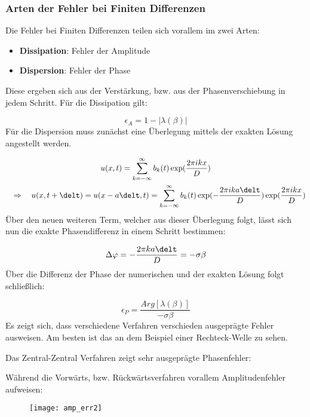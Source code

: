\subsubsection{Arten der Fehler bei Finiten Differenzen}
Die Fehler bei Finiten Differenzen teilen sich vorallem im zwei Arten:
\par
\begin{itemize}
	\item \textbf{Dissipation}: Fehler der Amplitude
	\item \textbf{Dispersion}: Fehler der Phase
\end{itemize}
Diese ergeben sich aus der Verst\"arkung, bzw. aus der Phasenverschiebung in jedem Schritt. F\"ur die Dissipation gilt:
\par
\begin{equation*}
	\epsilon_A = 1 - |\lambda(\beta)|
\end{equation*}
F\"ur die Dispersion muss zun\"achst eine \"Uberlegung mittels der exakten L\"osung angestellt werden.
\par
\begin{multline*}
	u(x,t) = \sum_{k=-\infty}^{\infty}b_k(t) \exp(\frac{2\pi i k x}{D}) \\~~~\Rightarrow~~~ u(x,t+\delt) = u(x-a\delt,t) = \sum_{k=-\infty}^{\infty}b_k(t)  \exp(-\frac{2\pi i k a\delt}{D}) \exp(\frac{2\pi i k x}{D})
\end{multline*}
\"Uber den neuen weiteren Term, welcher aus dieser \"Uberlegung folgt, l\"asst sich nun die exakte Phasendifferenz in einem Schritt bestimmen:
\par
\begin{equation*}
	\Delta \varphi = -\frac{2\pi k a \delt}{D} = -\sigma\beta
\end{equation*}
\"Uber die Differenz der Phase der numerischen und der exakten L\"osung folgt schlie\ss{}lich:
\par
\begin{equation*}
	\epsilon_P = \frac{Arg[\lambda(\beta)]}{-\sigma\beta}
\end{equation*}
Es zeigt sich, dass verschiedene Verfahren verschieden ausgepr\"agte Fehler ausweisen.
Am besten ist das an dem Beispiel einer Rechteck-Welle zu sehen.

\newpage

Das Zentral-Zentral Verfahren zeigt sehr ausgepr\"agte Phasenfehler:
\par
\begin{figure*}[ht]
	\centering
\end{figure*}
W\"ahrend die Vorw\"arts, bzw. R\"uckw\"artsverfahren vorallem Amplitudenfehler aufweisen:
\par
\begin{figure*}[ht]
	\centering
	\texttt{[image: amp\_err2]}
\end{figure*}

